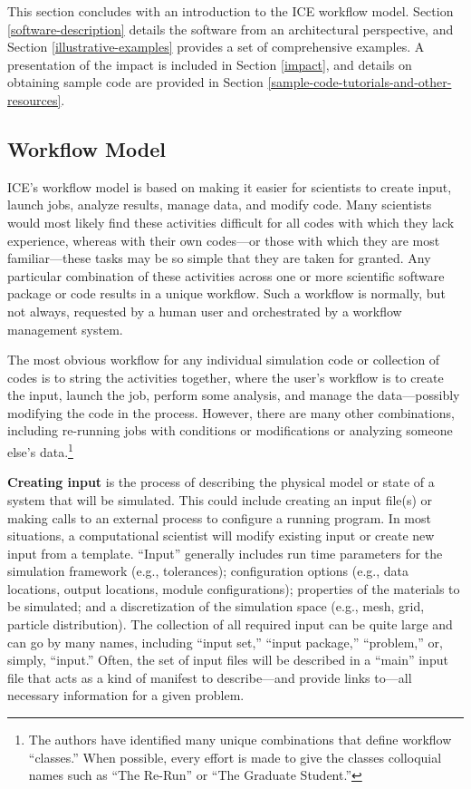This section concludes with an introduction to the ICE workflow model. Section \ref{software-description} details the software
from an architectural perspective, and Section \ref{illustrative-examples}
provides a set of comprehensive examples. A
presentation of the impact is included in Section \ref{impact}, and details on obtaining sample 
code are provided in Section \ref{sample-code-tutorials-and-other-resources}.

\subsection{Workflow Model}\label{workflow-model}

ICE's workflow model is based on making it easier for scientists to create
input, launch jobs, analyze results, manage data, and modify code. Many
scientists would most likely find these activities difficult for all codes with
which they lack experience, whereas with their own codes---or those with which
they are most familiar---these tasks may be so simple that they are taken for
granted. Any particular combination of these activities across one or more
scientific software package or code results in a unique workflow. Such a
workflow is normally, but not always, requested by a human user and
orchestrated by a workflow management system.

The most obvious workflow for any individual simulation code or
collection of codes is to string the activities together, where the user's
workflow is to create the input, launch the job, perform some analysis,
and manage the data---possibly modifying the code in the process. However, 
there are many other combinations, including re-running jobs with
conditions or modifications or analyzing someone else's data.\footnote{The
authors have identified many unique combinations that
define workflow ``classes.'' When possible, every effort is made to give the
classes colloquial names such as ``The Re-Run'' or ``The Graduate Student.''}

\textbf{Creating input} is the process of describing the physical model
or state of a system that will be simulated. This could include creating
an input file(s) or making calls to an external process to configure a
running program. In most situations, a computational scientist will
modify existing input or create new input from a template. ``Input''
generally includes run time parameters for the simulation framework
(e.g., tolerances); configuration options (e.g., data locations, output
locations, module configurations); properties of the materials to be
simulated; and a discretization of the simulation space (e.g., mesh,
grid, particle distribution). The collection of all required input can
be quite large and can go by many names, including ``input set,''
``input package,'' ``problem,'' or, simply, ``input.'' Often, the set of
input files will be described in a ``main'' input file that acts as a
kind of manifest to describe---and provide links to---all necessary
information for a given problem.

